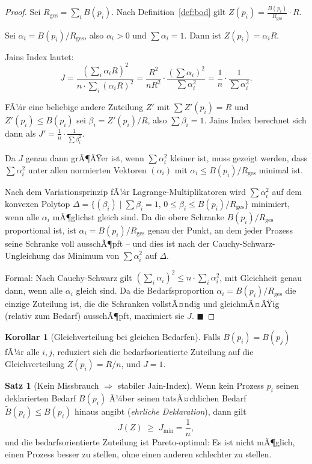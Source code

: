 ﻿\documentclass[a4paper,12pt]{article}
\theoremstyle{definition}
\newtheorem{satz}{Satz}
\newtheorem{korollar}{Korollar}
\begin{document}
\begin{proof}
Sei $R_{\mathrm{ges}} = \sum_i B(p_i)$.
Nach Definition~\ref{def:bod} gilt $Z(p_i) = \frac{B(p_i)}{R_{\mathrm{ges}}} \cdot R$.

Sei $\alpha_i = B(p_i)/R_{\mathrm{ges}}$, also $\alpha_i > 0$ und
$\sum \alpha_i = 1$. Dann ist $Z(p_i) = \alpha_i R$.

Jains Index lautet:
\[
  J = \frac{(\sum_i \alpha_i R)^2}{n \cdot \sum_i (\alpha_i R)^2}
    = \frac{R^2}{n R^2} \cdot \frac{(\sum \alpha_i)^2}{\sum \alpha_i^2}
    = \frac{1}{n} \cdot \frac{1}{\sum \alpha_i^2}.
\]

FÃ¼r eine beliebige andere Zuteilung $Z'$ mit $\sum Z'(p_i) = R$ und
$Z'(p_i) \leq B(p_i)$ sei $\beta_i = Z'(p_i)/R$, also $\sum \beta_i = 1$.
Jains Index berechnet sich dann als $J' = \frac{1}{n} \cdot \frac{1}{\sum \beta_i^2}$.

Da $J$ genau dann grÃ¶ÃŸer ist, wenn $\sum \alpha_i^2$ kleiner ist, muss
gezeigt werden, dass $\sum \alpha_i^2$ unter allen normierten
Vektoren $(\alpha_i)$ mit $\alpha_i \leq B(p_i)/R_{\mathrm{ges}}$ minimal ist.

Nach dem Variationsprinzip fÃ¼r Lagrange-Multiplikatoren wird
$\sum \alpha_i^2$ auf dem konvexen Polytop
$\Delta = \{(\beta_i) \mid \sum \beta_i = 1,\, 0 \leq \beta_i \leq B(p_i)/R_{\mathrm{ges}}\}$
minimiert, wenn alle $\alpha_i$ mÃ¶glichst gleich sind.
Da die obere Schranke $B(p_i)/R_{\mathrm{ges}}$ proportional ist, ist
$\alpha_i = B(p_i)/R_{\mathrm{ges}}$ genau der Punkt, an dem jeder
Prozess seine Schranke voll ausschÃ¶pft -- und dies ist nach der
Cauchy-Schwarz-Ungleichung das Minimum von $\sum \alpha_i^2$ auf $\Delta$.

Formal: Nach Cauchy-Schwarz gilt
$(\sum_i \alpha_i)^2 \leq n \cdot \sum_i \alpha_i^2$, mit Gleichheit
genau dann, wenn alle $\alpha_i$ gleich sind.
Da die Bedarfsproportion $\alpha_i = B(p_i)/R_{\mathrm{ges}}$ die
einzige Zuteilung ist, die die Schranken vollstÃ¤ndig und gleichmÃ¤ÃŸig
(relativ zum Bedarf) ausschÃ¶pft, maximiert sie $J$.
\hfill$\blacksquare$
\end{proof}

\begin{korollar}[Gleichverteilung bei gleichen Bedarfen]
Falls $B(p_i) = B(p_j)$ fÃ¼r alle $i, j$, reduziert sich die
bedarfsorientierte Zuteilung auf die Gleichverteilung
$Z(p_i) = R/n$, und $J = 1$.
\end{korollar}

\begin{satz}[Kein Missbrauch $\Rightarrow$ stabiler Jain-Index]
\label{satz:kein_missbrauch}
Wenn kein Prozess $p_i$ seinen deklarierten Bedarf $B(p_i)$ Ã¼ber
seinen tatsÃ¤chlichen Bedarf $\tilde{B}(p_i) \leq B(p_i)$ hinaus
angibt (\emph{ehrliche Deklaration}), dann gilt
\[
  J(Z) \;\geq\; J_{\min} = \frac{1}{n},
\]
und die bedarfsorientierte Zuteilung ist Pareto-optimal: Es ist
nicht mÃ¶glich, einen Prozess besser zu stellen, ohne einen anderen
schlechter zu stellen.
\end{satz}
\end{document}
